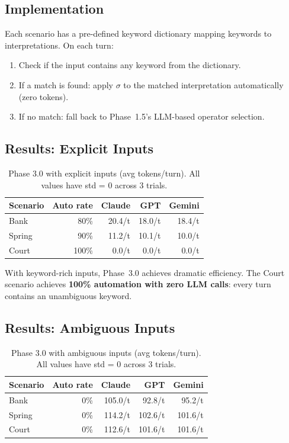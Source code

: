 \documentclass[11pt,a4paper]{article}
\begin{document}
\subsection{Implementation}

Each scenario has a pre-defined keyword dictionary mapping keywords to
interpretations. On each turn:
\begin{enumerate}
    \item Check if the input contains any keyword from the dictionary.
    \item If a match is found: apply $\sigma$ to the matched interpretation
    automatically (zero tokens).
    \item If no match: fall back to Phase~1.5's LLM-based operator selection.
\end{enumerate}

\subsection{Results: Explicit Inputs}

\begin{table}[ht]
\centering
\begin{tabular}{lrrrr}
\toprule
\textbf{Scenario} & \textbf{Auto rate} & \textbf{Claude} & \textbf{GPT} & \textbf{Gemini} \\
\midrule
Bank & 80\% & 20.4/t & 18.0/t & 18.4/t \\
Spring & 90\% & 11.2/t & 10.1/t & 10.0/t \\
Court & 100\% & 0.0/t & 0.0/t & 0.0/t \\
\bottomrule
\end{tabular}
\caption{Phase 3.0 with explicit inputs (avg tokens/turn). All values have
std = 0 across 3 trials.}
\label{tab:phase3_0_explicit}
\end{table}

With keyword-rich inputs, Phase~3.0 achieves dramatic efficiency. The Court
scenario achieves \textbf{100\% automation with zero LLM calls}: every turn
contains an unambiguous keyword.

\subsection{Results: Ambiguous Inputs}

\begin{table}[ht]
\centering
\begin{tabular}{lrrrr}
\toprule
\textbf{Scenario} & \textbf{Auto rate} & \textbf{Claude} & \textbf{GPT} & \textbf{Gemini} \\
\midrule
Bank & 0\% & 105.0/t & 92.8/t & 95.2/t \\
Spring & 0\% & 114.2/t & 102.6/t & 101.6/t \\
Court & 0\% & 112.6/t & 101.6/t & 101.6/t \\
\bottomrule
\end{tabular}
\caption{Phase 3.0 with ambiguous inputs (avg tokens/turn). All values have
std = 0 across 3 trials.}
\label{tab:phase3_0_ambiguous}
\end{table}
\end{document}
